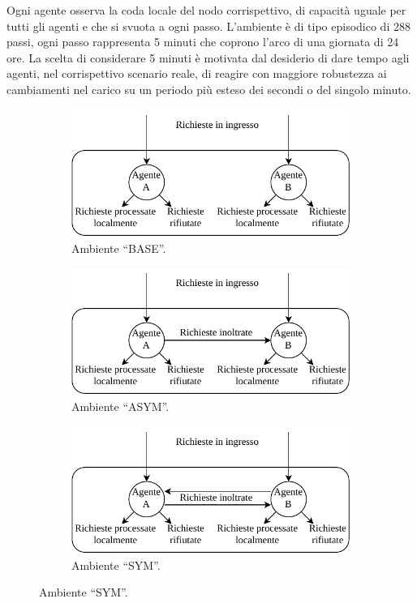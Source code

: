 \documentclass[a4paper, twocolumn]{article}
\begin{document}
Ogni agente osserva la coda locale del nodo corrispettivo, di capacità uguale per tutti gli agenti e che si svuota a ogni passo. L'ambiente è di tipo episodico di 288 passi, ogni passo rappresenta 5 minuti che coprono l'arco di una giornata di 24 ore. La scelta di considerare 5 minuti è motivata dal desiderio di dare tempo agli agenti, nel corrispettivo scenario reale, di reagire con maggiore robustezza ai cambiamenti nel carico su un periodo più esteso dei secondi o del singolo minuto.

\begin{figure}
    \centering

    \begin{subfigure}{\columnwidth}
        \centering
        \includegraphics[width=\linewidth]{assets/4/1_sym_no_fw.pdf}
        \caption{Ambiente ``BASE''.}
    \end{subfigure}
    
    \begin{subfigure}{\columnwidth}
        \centering
        \includegraphics[width=\linewidth]{assets/4/2_asym.pdf}
        \caption{Ambiente ``ASYM''.}
    \end{subfigure}

    \begin{subfigure}{\columnwidth}
        \centering
        \includegraphics[width=\linewidth]{assets/4/3_sym_fw.pdf}
        \caption{Ambiente ``SYM''.}
    \end{subfigure}
    

\end{figure}
\end{document}
